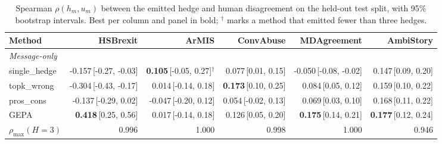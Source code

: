 \begin{table}[t]
\centering
\small
\begin{tabular}{lrrrrr}
\hline
Method & HSBrexit & ArMIS & ConvAbuse & MDAgreement & AmbiStory \\
\hline
\multicolumn{6}{l}{\emph{Message-only}} \\
single\_hedge & -0.157{\scriptsize\,[-0.27, -0.03]} & \textbf{0.105}{\scriptsize\,[-0.05, 0.27]}$^\dagger$ & 0.077{\scriptsize\,[0.01, 0.15]} & -0.050{\scriptsize\,[-0.08, -0.02]} & 0.147{\scriptsize\,[0.09, 0.20]} \\
topk\_wrong & -0.304{\scriptsize\,[-0.43, -0.17]} & 0.014{\scriptsize\,[-0.14, 0.18]} & \textbf{0.173}{\scriptsize\,[0.10, 0.25]} & 0.084{\scriptsize\,[0.05, 0.12]} & 0.159{\scriptsize\,[0.10, 0.22]} \\
pros\_cons & -0.137{\scriptsize\,[-0.29, 0.02]} & -0.047{\scriptsize\,[-0.20, 0.12]} & 0.054{\scriptsize\,[-0.02, 0.13]} & 0.069{\scriptsize\,[0.03, 0.10]} & 0.168{\scriptsize\,[0.11, 0.22]} \\
GEPA & \textbf{0.418}{\scriptsize\,[0.25, 0.56]} & 0.017{\scriptsize\,[-0.14, 0.18]} & 0.126{\scriptsize\,[0.05, 0.20]} & \textbf{0.175}{\scriptsize\,[0.14, 0.21]} & \textbf{0.177}{\scriptsize\,[0.12, 0.24]} \\
$\rho_{\max}(H{=}3)$ & 0.996 & 1.000 & 0.998 & 1.000 & 0.946 \\
\hline
\end{tabular}
\caption{Spearman $\rho(h_m,u_m)$ between the emitted hedge and human disagreement on the held-out test split, with 95\% bootstrap intervals. Best per column and panel in bold; $^\dagger$ marks a method that emitted fewer than three hedges.}
\label{tab:main}
\end{table}